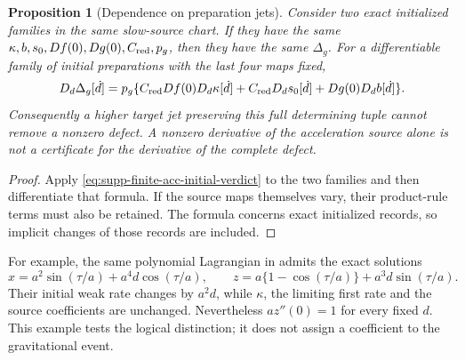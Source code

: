 \documentclass[11pt]{article}
\numberwithin{equation}{section}
\newtheorem{proposition}[proposition]{Proposition}
\theoremstyle{definition}
\theoremstyle{remark}
\begin{document}
\begin{proposition}[Dependence on preparation jets]
\label{prop:supp-finite-acc-invariance}
Consider two exact initialized families in the same slow-source chart.
If they have the same $\kappa,b,s_0,Df(0),Dg(0),C_{\rm red},p_g$, then
they have the same $\Delta_g$.  For a differentiable family of initial
preparations with the last four maps fixed,
\begin{equation}
 D_d\Delta_g[\dot d]=p_g\{C_{\rm red}Df(0)D_d\kappa[\dot d]
 +C_{\rm red}D_ds_0[\dot d]+Dg(0)D_db[\dot d]\}.
 \label{eq:supp-finite-acc-total-response}
\end{equation}
Consequently a higher target jet preserving this full determining tuple
cannot remove a nonzero defect.  A nonzero derivative of the acceleration
source alone is not a certificate for the derivative of the complete defect.
\end{proposition}
\begin{proof}
Apply \eqref{eq:supp-finite-acc-initial-verdict} to the two families and
then differentiate that formula.  If the source maps themselves vary, their
product-rule terms must also be retained.  The formula concerns exact
initialized records, so implicit changes of those records are included.
\end{proof}

For example, the same polynomial Lagrangian in
 admits the exact solutions
\[
 x=a^2\sin(\tau/a)+a^4d\cos(\tau/a),\qquad
 z=a\{1-\cos(\tau/a)\}+a^3d\sin(\tau/a).
\]
Their initial weak rate changes by $a^2d$, while $\kappa$, the limiting
first rate and the source coefficients are unchanged.  Nevertheless
$az''(0)=1$ for every fixed $d$.  This example tests the logical distinction;
it does not assign a coefficient to the gravitational event.
\end{document}
